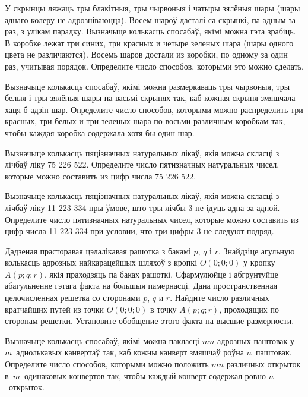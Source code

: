 \documentclass[12pt, a4paper]{article}
\begin{document}
\begin{problemList}
\bigskip

\problemItemSimple
{У скрынцы ляжаць тры блакітныя, тры чырвоныя і чатыры зялёныя шары (шары аднаго колеру
не адрозніваюцца). Восем шароў дасталі са скрынкі, па адным за раз, з улікам парадку.
Вызначыце колькасць спосабаў, якімі можна гэта зрабіць.}
{В коробке лежат три синих, три красных и четыре зеленых шара (шары
одного цвета не различаются). Восемь шаров достали из коробки, по одному
за один раз, учитывая порядок. Определите число способов, которыми
это можно сделать.}

\bigskip

\problemItemSimple
{Вызначыце колькасць спосабаў, якімі можна размеркаваць тры чырвоныя, тры белыя і
тры зялёныя шары па васьмі скрынях так, каб кожная скрыня змяшчала хаця б адзін шар.}
{Определите число способов, которыми можно распределить три красных,
три белых и три зеленых шара по восьми различным коробкам так, чтобы
каждая коробка содержала хотя бы один шар.}

\bigskip

\problemItemSimple
{Вызначыце колькасць пяцізначных натуральных лікаў, якія можна скласці
з лічбаў ліку 75\,\,226\,\,522.}
{Определите число пятизначных натуральных чисел, которые можно составить
из цифр числа 75\,\,226\,\,522.}

\bigskip

\problemItemSimple
{Вызначыце колькасць пяцізначных натуральных лікаў, якія можна скласці
з лічбаў ліку 11\,\,223\,\,334 пры ўмове, што тры лічбы 3 не ідуць адна за адной.}
{Определите число пятизначных натуральных чисел, которые можно составить
из цифр числа 11\,\,223\,\,334 при условии, что три цифры 3 не следуют подряд.}

\bigskip

\problemItemSimple
{Дадзеная прасторавая цэлалікавая рашотка з бакамі $p$, $q$ і $r$.
Знайдзіце агульную колькасць адрозных найкарацейшых шляхоў з кропкі $O(0; 0; 0)$ у кропку
$A(p; q; r)$, якія праходзяць па баках рашоткі. Сфармулюйце і абгрунтуйце абагульненне гэтага
факта на большыя памернасці.}
{Дана пространственная целочисленная решетка со сторонами $p$, $q$ и $r$.
Найдите число различных кратчайших путей из точки $O(0; 0; 0)$ в точку
$A(p; q; r)$, проходящих по сторонам решетки. Установите обобщение этого
факта на высшие размерности.}

\bigskip

\problemItemSimple
{Вызначыце колькасць спосабаў, якімі можна пакласці $mn$ адрозных
паштовак у~$m$~аднолькавых канвертаў так, каб кожны канверт змяшчаў
роўна $n$~паштовак.}
{Определите число способов, которыми можно положить $mn$ различных
открыток в~$m$~одинаковых конвертов так, чтобы каждый конверт содержал
ровно $n$~открыток.}


\end{problemList}
\end{document}
